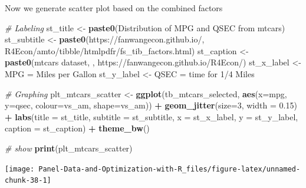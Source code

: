 \documentclass[
]{book}
\newenvironment{Shaded}{\begin{snugshade}}{\end{snugshade}}
\newcommand{\CommentTok}[1]{\textcolor[rgb]{0.56,0.35,0.01}{\textit{#1}}}
\newcommand{\DataTypeTok}[1]{\textcolor[rgb]{0.13,0.29,0.53}{#1}}
\newcommand{\DecValTok}[1]{\textcolor[rgb]{0.00,0.00,0.81}{#1}}
\newcommand{\FloatTok}[1]{\textcolor[rgb]{0.00,0.00,0.81}{#1}}
\newcommand{\KeywordTok}[1]{\textcolor[rgb]{0.13,0.29,0.53}{\textbf{#1}}}
\newcommand{\NormalTok}[1]{#1}
\newcommand{\OperatorTok}[1]{\textcolor[rgb]{0.81,0.36,0.00}{\textbf{#1}}}
\newcommand{\StringTok}[1]{\textcolor[rgb]{0.31,0.60,0.02}{#1}}
\begin{document}
Now we generate scatter plot based on the combined factors

\begin{Shaded}
\begin{Highlighting}[]
\CommentTok{\# Labeling}
\NormalTok{st\_title \textless{}{-}}\StringTok{ }\KeywordTok{paste0}\NormalTok{(}\StringTok{\textquotesingle{}Distribution of MPG and QSEC from mtcars\textquotesingle{}}\NormalTok{)}
\NormalTok{st\_subtitle \textless{}{-}}\StringTok{ }\KeywordTok{paste0}\NormalTok{(}\StringTok{\textquotesingle{}https://fanwangecon.github.io/\textquotesingle{}}\NormalTok{,}
                      \StringTok{\textquotesingle{}R4Econ/amto/tibble/htmlpdfr/fs\_tib\_factors.html\textquotesingle{}}\NormalTok{)}
\NormalTok{st\_caption \textless{}{-}}\StringTok{ }\KeywordTok{paste0}\NormalTok{(}\StringTok{\textquotesingle{}mtcars dataset, \textquotesingle{}}\NormalTok{,}
                     \StringTok{\textquotesingle{}https://fanwangecon.github.io/R4Econ/\textquotesingle{}}\NormalTok{)}
\NormalTok{st\_x\_label \textless{}{-}}\StringTok{ \textquotesingle{}MPG = Miles per Gallon\textquotesingle{}}
\NormalTok{st\_y\_label \textless{}{-}}\StringTok{ \textquotesingle{}QSEC = time for 1/4 Miles\textquotesingle{}}

\CommentTok{\# Graphing}
\NormalTok{plt\_mtcars\_scatter \textless{}{-}}\StringTok{ }
\StringTok{  }\KeywordTok{ggplot}\NormalTok{(tb\_mtcars\_selected, }
         \KeywordTok{aes}\NormalTok{(}\DataTypeTok{x=}\NormalTok{mpg, }\DataTypeTok{y=}\NormalTok{qsec, }\DataTypeTok{colour=}\NormalTok{vs\_am, }\DataTypeTok{shape=}\NormalTok{vs\_am)) }\OperatorTok{+}
\StringTok{  }\KeywordTok{geom\_jitter}\NormalTok{(}\DataTypeTok{size=}\DecValTok{3}\NormalTok{, }\DataTypeTok{width =} \FloatTok{0.15}\NormalTok{) }\OperatorTok{+}
\StringTok{  }\KeywordTok{labs}\NormalTok{(}\DataTypeTok{title =}\NormalTok{ st\_title, }\DataTypeTok{subtitle =}\NormalTok{ st\_subtitle,}
       \DataTypeTok{x =}\NormalTok{ st\_x\_label, }\DataTypeTok{y =}\NormalTok{ st\_y\_label, }\DataTypeTok{caption =}\NormalTok{ st\_caption) }\OperatorTok{+}
\StringTok{  }\KeywordTok{theme\_bw}\NormalTok{()}

\CommentTok{\# show}
\KeywordTok{print}\NormalTok{(plt\_mtcars\_scatter)}
\end{Highlighting}
\end{Shaded}

\begin{center}\texttt{[image: Panel-Data-and-Optimization-with-R\_files/figure-latex/unnamed-chunk-38-1]} \end{center}
\end{document}
